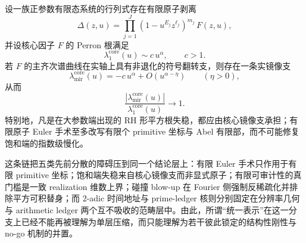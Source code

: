 \begin{conjecture}\label{conj:conclusion-finite-atomic-stripping-mirror-perron-universality}
设一族正参数有限态系统的行列式存在有限原子剥离
\[
\Delta(z,u)=
\prod_{j=1}^{J}(1-u^{E_j}z^{\ell_j})^{m_j}\,F(z,u),
\]
并设核心因子 \(F\) 的 Perron 根满足
\[
\lambda_1^{\mathrm{core}}(u)\sim c\,u^\alpha,
\qquad
c>1.
\]
若 \(F\) 的主齐次谱曲线在实轴上具有非退化的符号翻转支，则存在一条实镜像支
\[
\lambda_{\mathrm{mir}}^{\mathrm{core}}(u)
=
-c\,u^\alpha+O(u^{\alpha-\eta})
\qquad
(\eta>0),
\]
从而
\[
\frac{|\lambda_{\mathrm{mir}}^{\mathrm{core}}(u)|}{\lambda_1^{\mathrm{core}}(u)}\longrightarrow 1.
\]
特别地，凡是在大参数端出现的 RH 形平方根失稳，都应由核心镜像支承担；有限原子 Euler 手术至多改写有限个 primitive 坐标与 Abel 有限部，而不可能修复饱和端的指数级慢化。
\end{conjecture}

\noindent
这条链把五类先前分散的障碍压到同一个结论层上：有限 Euler 手术只作用于有限 primitive 坐标；饱和端失稳来自核心镜像支而非显式原子；有限可审计性的真门槛是一致 realization 维数上界；碰撞 blow-up 在 Fourier 侧强制反稀疏化并排除平方可积替身；而 \(2\)-adic 时间地址与 prime-ledger 核则分别固定在分辨率几何与 arithmetic ledger 两个互不吸收的范畴层中。由此，所谓“统一表示”在这一分支上已经不能再被理解为单层压缩，而只能理解为若干彼此锁定的结构性刚性与 no-go 机制的并置。
